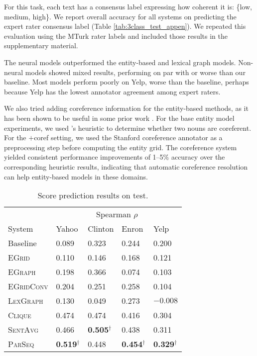 \documentclass[11pt,a4paper]{article}
\newcommand \egrid{\textsc{EGrid}\xspace}
\newcommand \egraph{\textsc{EGraph}\xspace}
\newcommand \lexgraph{\textsc{LexGraph}\xspace}
\newcommand \parseq{\textsc{ParSeq}\xspace}
\newcommand \clique{\textsc{Clique}\xspace}
\newcommand \sentavg{\textsc{SentAvg}\xspace}
\newcommand \egridconv{\textsc{EGridConv}\xspace}
\begin{document}
For this task, each text has a consensus label expressing how coherent it is: \{low, medium, high\}. 
We report overall accuracy for all systems on predicting the expert rater consensus label (Table \ref{tab:3class_test_appen}). We repeated this evaluation using the MTurk rater labels and included those results in the supplementary material. 

The neural models outperformed the entity-based and lexical graph models.  Non-neural models showed mixed results, performing on par with or worse than our baseline. Most models perform poorly on Yelp, worse than the baseline, perhaps because Yelp has the lowest annotator agreement among expert raters.


We also tried adding coreference information for the entity-based methods, as it has been shown to be useful in some prior work \cite{barzilay_CL_2008,elsner-charniak:2008:ACLShort}. For the base entity model experiments, we used \citet{barzilay_CL_2008}'s heuristic to determine whether two nouns are coreferent.  For the $+$coref setting, we used the Stanford coreference annotator \cite{clark2015entity} as a preprocessing step before computing the entity grid.  The coreference system yielded consistent performance improvements of 1--5\% accuracy over the corresponding heuristic results, indicating that automatic coreference resolution can help entity-based models in these domains.











\begin{table}\begin{center}
 \begin{small}
\begin{tabular}{lllll}
	\toprule
    & \multicolumn{4}{c}{Spearman $\rho$} \\
	System & Yahoo & Clinton & Enron  & Yelp \\	
    \midrule
    Baseline & 0.089 & 0.323 & 0.244 & 0.200 \\ 
    \midrule
    \egrid & 0.110 & 0.146 & 0.168 & 0.121 \\
    \egraph & 0.198 & 0.366 & 0.074 & 0.103 \\
	\egridconv & 0.204 & 0.251 & 0.258 & 0.104 \\ 
\midrule
    \lexgraph & 0.130 & 0.049 & 0.273 & $-0.008$ \\ 
    \midrule
    \clique & 0.474 & 0.474 & 0.416 & 0.304 \\
\sentavg & 0.466 & \textbf{0.505}$^{\dag}$ & 0.438 & 0.311 \\	
\parseq & \textbf{0.519}$^{\dag}$ & 0.448 & \textbf{0.454}$^{\dag}$ & \textbf{0.329}$^{\dag}$ \\	
\bottomrule
\end{tabular}
 \end{small}
\caption{Score prediction results on test.}
\label{tab:score_predict_test}
\end{center}
\end{table}
\end{document}
